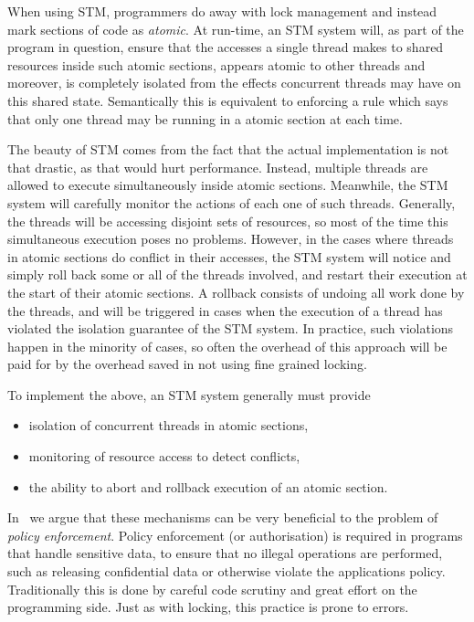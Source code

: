 When using STM, programmers do away with lock management and instead mark sections
of code as \emph{atomic}. At run-time, an STM system will, as part of the program
in question, ensure that the accesses a single thread makes to shared resources
inside such atomic sections, appears atomic to other threads and moreover, is
completely isolated from the effects concurrent threads may have on this shared
state. Semantically this is equivalent to enforcing a rule which says that only
one thread may be running in a atomic section at each time.

The beauty of STM comes from the fact that the actual implementation is not that
drastic, as that would hurt performance. Instead, multiple threads are allowed to
execute simultaneously inside atomic sections. Meanwhile, the STM system will carefully
monitor the actions of each one of such threads. Generally, the threads will be
accessing disjoint sets of resources, so most of the time this simultaneous execution
poses no problems. However, in the cases where threads in atomic sections do conflict
in their accesses, the STM system will notice and simply roll back some or all
of the threads involved, and restart their execution at the start of their atomic
sections. A rollback consists of undoing all work done by the threads, and will
be triggered in cases when the execution of a thread has violated the isolation
guarantee of the STM system. In practice, such violations happen in the minority
of cases, so often the overhead of this approach will be paid for by the overhead
saved in not using fine grained locking.

To implement the above, an STM system generally must provide
\begin{itemize}
    \item isolation of concurrent threads in atomic sections,
    \item monitoring of resource access to detect conflicts,
    \item the ability to abort and rollback execution of an atomic section.
\end{itemize}
In~\cite{tmi} we argue that these mechanisms can be very beneficial to the problem
of \emph{policy enforcement}. Policy enforcement (or authorisation) is required
in programs that handle sensitive data, to ensure that no illegal operations are
performed, such as releasing confidential data or otherwise violate the applications
policy. Traditionally this is done by careful code scrutiny and great effort on
the programming side. Just as with locking, this practice is prone to errors.


